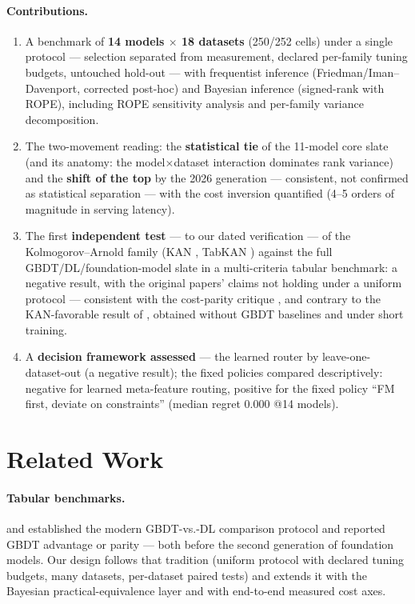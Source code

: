 \documentclass[11pt]{article}
\begin{document}
\paragraph{Contributions.}
\begin{enumerate}
  \item A benchmark of \textbf{14 models $\times$ 18 datasets} (250/252
    cells) under a single protocol --- selection separated from
    measurement, declared
    per-family tuning budgets, untouched hold-out --- with frequentist inference
    (Friedman/Iman--Davenport, corrected post-hoc) and Bayesian inference
    (signed-rank with ROPE), including ROPE sensitivity analysis and
    per-family variance decomposition.
  \item The two-movement reading: the \textbf{statistical tie} of the
    11-model core slate (and its anatomy: the model$\times$dataset
    interaction dominates rank variance) and the \textbf{shift of the
    top} by the 2026
    generation --- consistent, not confirmed as statistical
    separation --- with the cost inversion quantified (4--5 orders of
    magnitude in serving latency).
  \item The first \textbf{independent test} --- to our dated verification
    --- of the Kolmogorov--Arnold family (KAN \citep{kan2024}, TabKAN
    \citep{tabkan2025}) against the full GBDT/DL/foundation-model slate in
    a multi-criteria tabular benchmark: a negative result, with the
    original papers' claims not holding under a uniform protocol ---
    consistent with the cost-parity critique \citep{kancritical2024},
    and contrary to the KAN-favorable result of \citet{poeta2024},
    obtained without GBDT baselines and under short training.
  \item A \textbf{decision framework assessed} --- the learned
    router by leave-one-dataset-out (a negative result); the fixed
    policies compared descriptively:
    negative for learned meta-feature routing, positive for the fixed
    policy ``FM first, deviate on constraints'' (median regret 0.000 @14
    models).
\end{enumerate}

\section{Related Work}

\paragraph{Tabular benchmarks.} \citet{grinsztajn2022} and
\citet{mcelfresh2023} established the modern GBDT-vs.-DL comparison
protocol and reported GBDT advantage or parity --- both before the second
generation of foundation models. Our design follows that tradition
(uniform protocol with declared tuning budgets, many datasets,
per-dataset paired tests) and extends it
with the Bayesian practical-equivalence layer \citep{benavoli2017} and
with end-to-end measured cost axes.
\end{document}
